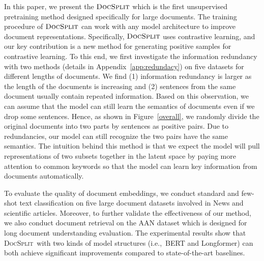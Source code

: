 \documentclass[11pt]{article}
\newcommand{\our}{\mbox{\textsc{DocSplit}}}
\begin{document}
In this paper, we present the $\our$ which is the first unsupervised pretraining method designed specifically for large documents.
The training procedure of $\our$ can work with any model architecture to improve document representations. 
Specifically, $\our$ uses contrastive learning,
and our key contribution is a new method for generating positive samples for contrastive learning.
To this end, we first investigate the information redundancy with two methods (details in Appendix~\ref{app:redundacy}) on five datasets for different lengths of documents.
We find (1) information redundancy is larger as the length of the documents is increasing and (2) sentences from the same document usually contain repeated information. 
Based on this observation, we can assume that the model can still learn the semantics of documents even if we drop some sentences. Hence, as shown in Figure~\ref{overall}, we randomly divide the original documents into two parts by sentences as positive pairs. Due to redundancies, our model can still recognize the two pairs have the same semantics. 
The intuition behind this method is that we expect the model will pull representations of two subsets together in the latent space by paying more attention to common keywords so that the model can learn key information from documents automatically. 

To evaluate the quality of document embeddings, we conduct standard and few-shot text classification on five large document datasets involved in News and scientific articles. Moreover, to further validate the effectiveness of our method, we also conduct document retrieval on the AAN dataset which is designed for long document understanding evaluation.
The experimental results show that \our~with two kinds of model structures (i.e.,~BERT and Longformer) can both achieve significant improvements compared to state-of-the-art baselines.
\end{document}
